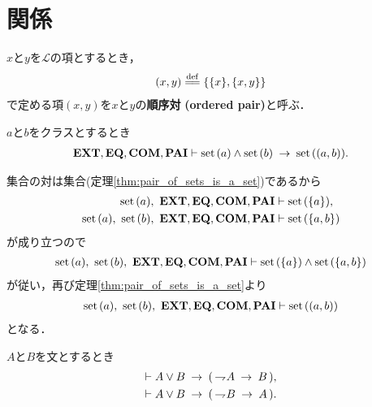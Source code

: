 \section{関係}
	\begin{screen}
		\begin{dfn}[順序対]
			$x$と$y$を$\mathcal{L}$の項とするとき，
			\begin{align}
				(x,y) \defeq \{\{x\},\{x,y\}\}
			\end{align}
			で定める項$(x,y)$を$x$と$y$の{\bf 順序対}
			{\bf (ordered pair)}と呼ぶ．
		\end{dfn}
	\end{screen}
	
	\begin{screen}
		\begin{thm}[集合の順序対は集合]
		\label{thm:ordered_pair_of_sets_is_a_set}
			$a$と$b$をクラスとするとき
			\begin{align}
				\EXTAX,\EQAX,\COMAX,\PAIAX \vdash
				\set{a} \wedge \set{b} \rarrow \set{(a,b)}.
			\end{align}
		\end{thm}
	\end{screen}
	
	\begin{prf}
		集合の対は集合(定理\ref{thm:pair_of_sets_is_a_set})であるから
		\begin{align}
			\set{a},\ \EXTAX,\EQAX,\COMAX,\PAIAX &\vdash \set{\{a\}}, \\
			\set{a},\ \set{b},\ \EXTAX,\EQAX,\COMAX,\PAIAX &\vdash \set{\{a,b\}}
		\end{align}
		が成り立つので
		\begin{align}
			\set{a},\ \set{b},\ \EXTAX,\EQAX,\COMAX,\PAIAX \vdash 
			\set{\{a\}} \wedge \set{\{a,b\}}
		\end{align}
		が従い，再び定理\ref{thm:pair_of_sets_is_a_set}より
		\begin{align}
			\set{a},\ \set{b},\ \EXTAX,\EQAX,\COMAX,\PAIAX \vdash \set{(a,b)}
		\end{align}
		となる．
		\QED
	\end{prf}
	
	\begin{screen}
		\begin{logicalthm}[選言三段論法]
		\label{logicalthm:disjunctive_syllogism}
			$A$と$B$を文とするとき
			\begin{align}
				\vdash A \vee B \rarrow (\, \negation A \rarrow B\, ), \\
				\vdash A \vee B \rarrow (\, \negation B \rarrow A\, ).
			\end{align}
		\end{logicalthm}
	\end{screen}
	
